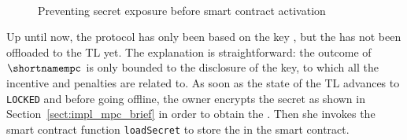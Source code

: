 \begin{figure}[t]
	\centering
	\\
	\vspace*{2pt}
	\caption{Preventing secret exposure before smart contract activation}%
	\label{fig:key_delayed_wrap}%
\end{figure}


Up until now, the protocol has only been based on the key \key, but the \secret has not been offloaded to the TL yet.
The explanation is straightforward: the outcome of $\shortnamempc$ is only bounded to the disclosure of the key, to which all the incentive and penalties are related to. 
As soon as the state of the TL advances to \texttt{LOCKED} and before going offline, the owner encrypts the secret \secret as shown in Section~\ref{sect:impl_mpc_brief} in order to obtain the \ciphertext. Then she invokes the smart contract function \texttt{loadSecret} to store the \ciphertext in the smart contract.